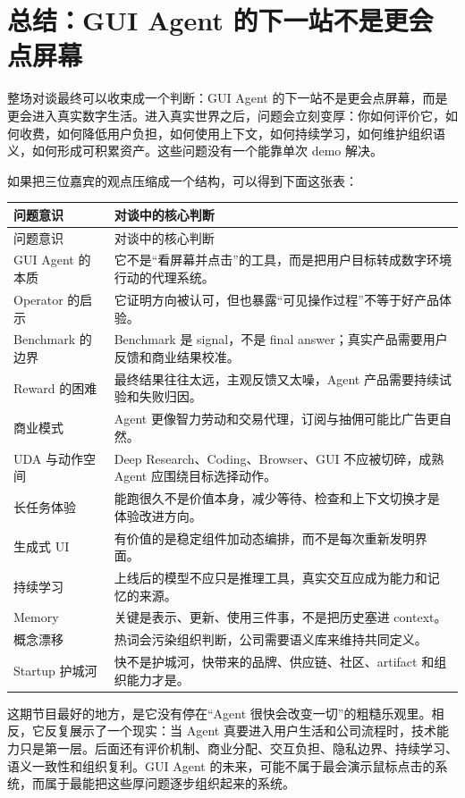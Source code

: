 \section{总结：GUI Agent 的下一站不是更会点屏幕}

整场对谈最终可以收束成一个判断：GUI Agent 的下一站不是更会点屏幕，而是更会进入真实数字生活。进入真实世界之后，问题会立刻变厚：你如何评价它，如何收费，如何降低用户负担，如何使用上下文，如何持续学习，如何维护组织语义，如何形成可积累资产。这些问题没有一个能靠单次 demo 解决。

如果把三位嘉宾的观点压缩成一个结构，可以得到下面这张表：

\begin{longtable}{>{\raggedright\arraybackslash}p{} >{\raggedright\arraybackslash}p{}}
\toprule
问题意识 & 对谈中的核心判断 \\
\midrule
\endfirsthead
\toprule
问题意识 & 对谈中的核心判断 \\
\midrule
\endhead
GUI Agent 的本质 & 它不是“看屏幕并点击”的工具，而是把用户目标转成数字环境行动的代理系统。 \\
Operator 的启示 & 它证明方向被认可，但也暴露“可见操作过程”不等于好产品体验。 \\
Benchmark 的边界 & Benchmark 是 signal，不是 final answer；真实产品需要用户反馈和商业结果校准。 \\
Reward 的困难 & 最终结果往往太远，主观反馈又太噪，Agent 产品需要持续试验和失败归因。 \\
商业模式 & Agent 更像智力劳动和交易代理，订阅与抽佣可能比广告更自然。 \\
UDA 与动作空间 & Deep Research、Coding、Browser、GUI 不应被切碎，成熟 Agent 应围绕目标选择动作。 \\
长任务体验 & 能跑很久不是价值本身，减少等待、检查和上下文切换才是体验改进方向。 \\
生成式 UI & 有价值的是稳定组件加动态编排，而不是每次重新发明界面。 \\
持续学习 & 上线后的模型不应只是推理工具，真实交互应成为能力和记忆的来源。 \\
Memory & 关键是表示、更新、使用三件事，不是把历史塞进 context。 \\
概念漂移 & 热词会污染组织判断，公司需要语义库来维持共同定义。 \\
Startup 护城河 & 快不是护城河，快带来的品牌、供应链、社区、artifact 和组织能力才是。 \\
\bottomrule
\end{longtable}

这期节目最好的地方，是它没有停在“Agent 很快会改变一切”的粗糙乐观里。相反，它反复展示了一个现实：当 Agent 真要进入用户生活和公司流程时，技术能力只是第一层。后面还有评价机制、商业分配、交互负担、隐私边界、持续学习、语义一致性和组织复利。GUI Agent 的未来，可能不属于最会演示鼠标点击的系统，而属于最能把这些厚问题逐步组织起来的系统。

